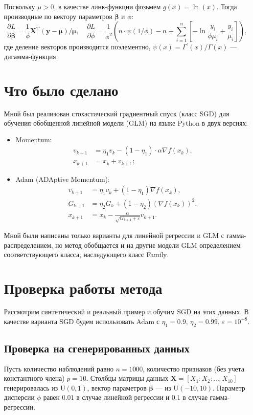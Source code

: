 \documentclass{article}
\begin{document}
Поскольку $\mu>0$, в качестве линк-функции фозьмем $g(x)=\ln(x)$. Тогда производные по вектору параметров $\bm\beta$ и $\phi$:
\[
    \frac{\partial L}{\partial \bm\beta}=\frac1\phi\mathbf{X}^\mathrm{T} (\mathbf{y} - \bm\mu) / \bm\mu,\quad \frac{\partial L}{\partial \phi}=\frac1{\phi^2}\left(n \cdot\psi(1 / \phi) - n + \sum_{i=1}^n\left[-\ln\frac{y_i}{\phi\mu_i}+ \frac{y_i}{\mu_i}\right]\right),
\]
где деление векторов производится поэлементно, $\psi(x)=\Gamma^\prime(x)/\Gamma(x)$ — дигамма-функция.

\section{Что было сделано}
Мной был реализован стохастический градиентный спуск (класс \textsf{SGD}) для обучения обобщенной линейной модели (GLM) на языке Python в двух версиях:
\begin{itemize}
    \item Momentum:
          \begin{align*}
              v_{k+1} & = \eta_1 v_{k} - (1 - \eta_1) \cdot \alpha \nabla f(x_k), \\
              x_{k+1} & = x_k + v_{k+1};
          \end{align*}
    \item Adam (ADAptive Momentum):
          \begin{align*}
              v_{k+1} & = \eta_1 v_{k} + (1 - \eta_1)  \nabla f(x_k),               \\
              G_{k+1} & = \eta_2 G_{k} + (1 - \eta_2) \left(\nabla f(x_k)\right)^2, \\
              x_{k+1} & = x_k - \frac{\alpha}{\sqrt{G_{k+1} + \varepsilon}}v_{k+1}.
          \end{align*}
\end{itemize}
Мной были написаны только варианты для линейной регрессии и GLM с гамма-распределением, но метод обобщается и на другие модели GLM определением соответствующего класса, наследующего класс \textsf{Family}.

\section{Проверка работы метода}
Рассмотрим синтетический и реальный пример и обучим \textsf{SGD} на этих данных. В качестве варианта \textsf{SGD} будем использовать Adam с $\eta_1=0.9$, $\eta_2=0.99$, $\varepsilon=10^{-8}$.
\subsection{Проверка на сгенерированных данных}
Пусть количество наблюдений равно $n=1000$, количество признаков (без учета константного члена) $p=10$. Столбцы матрицы данных $\mathbf{X}=[X_1:X_2:\ldots:X_{10}]$ генерировалась из $\mathrm{U}(0, 1)$, вектор параметров $\bm\beta$ --- из $\mathrm{U}(-10, 10)$. Параметр дисперсии $\phi$ равен $0.01$ в случае линейной регрессии и $0.1$ в случае гамма-регрессии.
\end{document}

